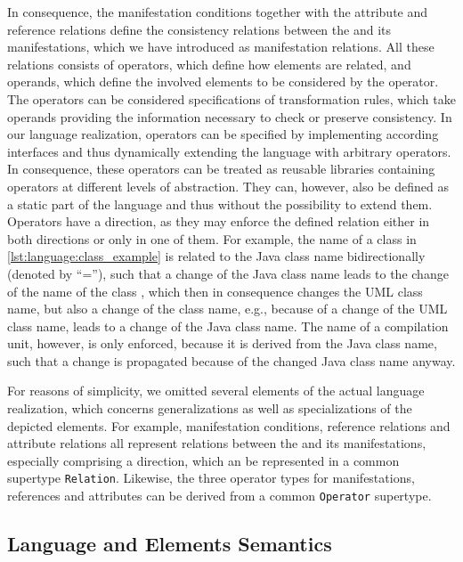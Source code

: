 In consequence, the manifestation conditions together with the attribute and reference relations define the consistency relations between the \commonality and its manifestations, which we have introduced as manifestation relations.
All these relations consists of operators, which define how elements are related, and operands, which define the involved elements to be considered by the operator. 
The operators can be considered specifications of transformation rules, which take operands providing the information necessary to check or preserve consistency.
In our language realization, operators can be specified by implementing according interfaces and thus dynamically extending the language with arbitrary operators.
In consequence, these operators can be treated as reusable libraries containing operators at different levels of abstraction.
They can, however, also be defined as a static part of the language and thus without the possibility to extend them.
Operators have a direction, as they may enforce the defined relation either in both directions or only in one of them.
For example, the name of a class in \autoref{lst:language:class_example} is related to the Java class name bidirectionally (denoted by \enquote{=}), such that a change of the Java class name leads to the change of the name of the class \commonality, which then in consequence changes the \gls{UML} class name, but also a change of the class \commonality name, e.g., because of a change of the \gls{UML} class name, leads to a change of the Java class name.
The name of a compilation unit, however, is only enforced, because it is derived from the Java class name, such that a change is propagated because of the changed Java class name anyway.

For reasons of simplicity, we omitted several elements of the actual language realization, which concerns generalizations as well as specializations of the depicted elements.
For example, manifestation conditions, reference relations and attribute relations all represent relations between the \commonality and its manifestations, especially comprising a direction, which an be represented in a common supertype \texttt{Relation}.
Likewise, the three operator types for manifestations, references and attributes can be derived from a common \texttt{Operator} supertype.


\subsection{Language and Elements Semantics}


